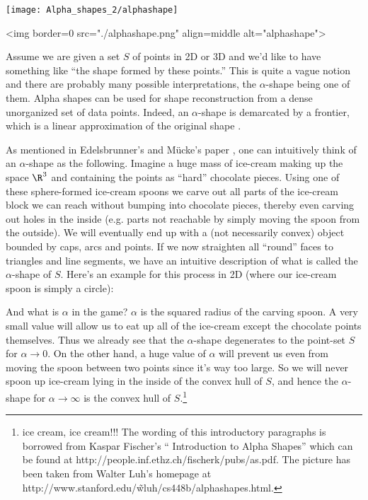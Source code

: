\begin{ccTexOnly}
\begin{center}
\texttt{[image: Alpha\_shapes\_2/alphashape]} 
\end{center}
\end{ccTexOnly}
\begin{ccHtmlOnly}
<img border=0 src="./alphashape.png"  align=middle  alt="alphashape">
\end{ccHtmlOnly}


Assume we are given a set $S$ of points in 2D or 3D and we'd like to
have something like ``the shape formed by these points.'' This is
quite a vague notion and there are probably many possible
interpretations, the $\alpha$-shape being one of them. Alpha shapes
can be used for shape reconstruction from a dense unorganized set of
data points. Indeed, an $\alpha$-shape is demarcated by a frontier,
which is a linear approximation of the original shape \cite{bb-srmua-97t}.

As mentioned in Edelsbrunner's and M\"ucke's paper \cite{em-tdas-94},
one can intuitively think of an $\alpha$-shape as the
following. Imagine a huge mass of ice-cream making up the space $\R^3$
and containing the points as ``hard'' chocolate pieces. Using one of
these sphere-formed ice-cream spoons we carve out all parts of the
ice-cream block we can reach without bumping into chocolate pieces,
thereby even carving out holes in the inside (e.g. parts not reachable
by simply moving the spoon from the outside). We will eventually end
up with a (not necessarily convex) object bounded by caps, arcs and
points. If we now straighten all ``round'' faces to triangles and line
segments, we have an intuitive description of what is called the
$\alpha$-shape of $S$. Here's an example for this process in 2D (where
our ice-cream spoon is simply a circle):
                                                                        
And what is $\alpha$ in the game?  $\alpha$ is the squared radius of the
carving spoon. A very small value will allow us to eat up all of the
ice-cream except the chocolate points themselves. Thus we already see
that the $\alpha$-shape degenerates to the point-set $S$ for
$\alpha \rightarrow 0$. On the other hand, a huge value of $\alpha$
will prevent us even from moving the spoon between two points since
it's way too large. So we will never spoon up ice-cream lying in the
inside of the convex hull of $S$, and hence the $\alpha$-shape for
$\alpha \rightarrow \infty$ is the convex hull of $S$.\footnote{ice cream, ice cream!!!
The wording of this introductory paragraphs is borrowed from  Kaspar Fischer's
`` Introduction to Alpha Shapes'' which can be found at 
http://people.inf.ethz.ch/fischerk/pubs/as.pdf.
The picture has been taken from Walter Luh's homepage at
http://www.stanford.edu/\~wluh/cs448b/alphashapes.html.}


